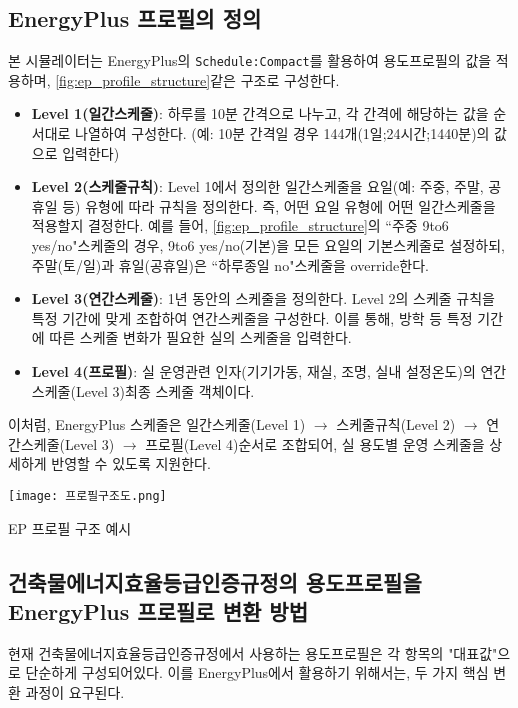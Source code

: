 \subsection{EnergyPlus 프로필의 정의}
본 시뮬레이터는 EnergyPlus의 \texttt{Schedule:Compact}를 활용하여 용도프로필의 값을 적용하며, \cref{fig:ep_profile_structure}\와 같은 구조로 구성한다.

\begin{itemize}
  \item \textbf{Level 1(일간스케줄)}: 하루를 10분 간격으로 나누고, 각 간격에 해당하는 값을 순서대로 나열하여 구성한다. (예: 10분 간격일 경우 144개(1일;24시간;1440분)의 값으로 입력한다)
  \item \textbf{Level 2(스케줄규칙)}: Level 1에서 정의한 일간스케줄을 요일(예: 주중, 주말, 공휴일 등) 유형에 따라 규칙을 정의한다. 즉, 어떤 요일 유형에 어떤 일간스케줄을 적용할지 결정한다. 예를 들어, \cref{fig:ep_profile_structure}의 ``주중 9to6 yes/no"스케줄의 경우, 9to6 yes/no(기본)을 모든 요일의 기본스케줄로 설정하되, 주말(토/일)과 휴일(공휴일)은 ``하루종일 no"스케줄을 override한다.
  \item \textbf{Level 3(연간스케줄)}: 1년 동안의 스케줄을 정의한다. Level 2의 스케줄 규칙을 특정 기간에 맞게 조합하여 연간스케줄을 구성한다. 이를 통해, 방학 등 특정 기간에 따른 스케줄 변화가 필요한 실의 스케줄을 입력한다.
  \item \textbf{Level 4(프로필)}: 실 운영관련 인자(기기가동, 재실, 조명, 실내 설정온도)의 연간스케줄(Level 3)최종 스케줄 객체이다.
\end{itemize}

이처럼, EnergyPlus 스케줄은 일간스케줄(Level 1) $\to$ 스케줄규칙(Level 2) $\to$ 연간스케줄(Level 3) $\to$ 프로필(Level 4)순서로 조합되어, 실 용도별 운영 스케줄을 상세하게 반영할 수 있도록 지원한다.

\begin{defaultfigure}
  \texttt{[image: 프로필구조도.png]}
  \caption{EP 프로필 구조 예시}
  \label{fig:ep_profile_structure}
\end{defaultfigure}

\subsection{건축물에너지효율등급인증규정의 용도프로필을 EnergyPlus 프로필로 변환 방법}
현재 건축물에너지효율등급인증규정에서 사용하는 용도프로필은 각 항목의 "대표값"으로 단순하게 구성되어있다. 이를 EnergyPlus에서 활용하기 위해서는, 두 가지 핵심 변환 과정이 요구된다.

